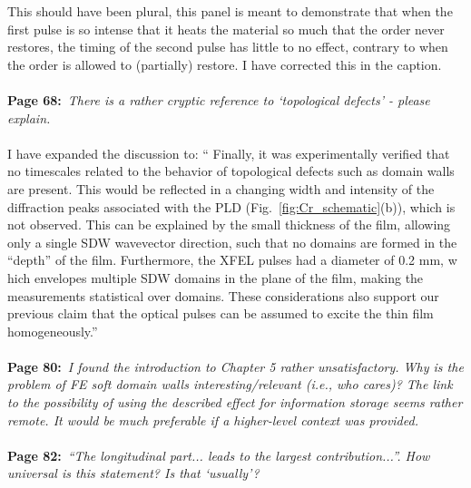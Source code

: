 \documentclass[a4, UTF8]{article}
\begin{document}
This should have been plural, this panel is meant to demonstrate that when the first pulse is so intense that it heats the material so much that the order never restores, the timing of the second pulse has little to no effect, contrary to when the order is allowed to (partially) restore.
I have corrected this in the caption.
\\\\
{\bf Page 68:}~{\it There is a rather cryptic reference to `topological defects' - please explain.}
\\\\
I have expanded the discussion to:
``
Finally, it was experimentally verified that no timescales related to the behavior of topological defects such as domain walls are present. This would be reflected in a changing width and intensity of the diffraction peaks associated with the PLD (Fig.~\ref{fig:Cr_schematic}(b)), which is not observed. This can be explained by the small thickness of the film, allowing only a single SDW wavevector direction, such that no domains are formed in the ``depth'' of the film. Furthermore, the XFEL pulses had a diameter of 0.2 mm, w hich envelopes multiple SDW domains in the plane of the film\cite{Nicholson2016}, making the measurements statistical over domains.
These considerations also support our previous claim that the optical pulses can be assumed to excite the thin film homogeneously.''
\\\\
{\bf Page 80:}~{\it I found the introduction to Chapter 5 rather unsatisfactory. Why is the problem of FE soft domain walls interesting/relevant (i.e., who cares)? The link to the possibility of using the described effect for information storage seems rather remote. It would be much preferable if a
higher-level context was provided.}
\\\\
{\bf Page 82:}~{\it ``The longitudinal part... leads to the largest contribution...''. How universal is this statement? Is that `usually'?}
\\\\
\end{document}
